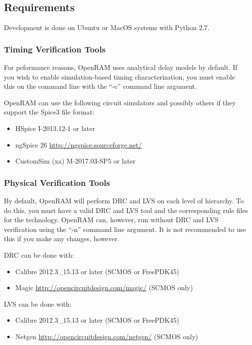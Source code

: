\subsection{Requirements}

Development is done on Ubuntu or MacOS systems with Python 2.7.


\subsubsection{Timing Verification Tools}

For peformance reasons, OpenRAM uses analytical delay models by
default. If you wish to enable simulation-based timing
characterization, you must enable this on the command line with the
``-c'' command line argument.


OpenRAM can use the following circuit simulators and possibly others
if they support the Spice3 file format:
\begin{itemize}
  \item HSpice I-2013.12-1 or later
  \item ngSpice 26 \url{http://ngspice.sourceforge.net/}
  \item CustomSim (xa) M-2017.03-SP5 or later
\end{itemize}

\subsubsection{Physical Verification Tools}

By default, OpenRAM will perform DRC and LVS on each level of
hierarchy.  To do this, you must have a valid DRC and LVS tool and the
corresponding rule files for the technology.  OpenRAM can, however,
run without DRC and LVS verification using the ``-n'' command line
argument. It is not recommended to use this if you make any changes,
however.

DRC can be done with:
\begin{itemize}
\item Calibre 2012.3\_15.13 or later (SCMOS or FreePDK45)
\item Magic \url{http://opencircuitdesign.com/magic/} (SCMOS only)
\end{itemize}

LVS can be done with:
\begin{itemize}
\item Calibre 2012.3\_15.13 or later (SCMOS or FreePDK45)
\item Netgen \url{http://opencircuitdesign.com/netgen/} (SCMOS only)
\end{itemize}

